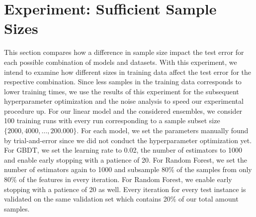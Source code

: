 \section{Experiment: Sufficient Sample Sizes}\label{sec:samplesize}

This section compares how a difference in sample size impact the test error for each possible combination of models and datasets. With this experiment, we intend to examine how different sizes in training data affect the test error for the respective combination. Since less samples in the training data corresponds to lower training times, we use the results of this experiment for the subsequent hyperparameter optimization and the noise analysis to speed our experimental procedure up. For our linear model and the considered ensembles, we consider 100 training runs with every run corresponding to a sample subset size $ \{2000, 4000, \dots, 200.000\} $. For each model, we set the parameters manually found by trial-and-error since we did not conduct the hyperparameter optimization yet. For GBDT, we set the learning rate to 0.02, the number of estimators to 1000 and enable early stopping with a patience of 20. For Random Forest, we set the number of estimators again to 1000 and subsample 80\% of the samples from only 80\% of the features in every iteration. For Random Forest, we enable early stopping with a patience of 20 as well. Every iteration for every test instance is validated on the same validation set which contains 20\% of our total amount samples.

